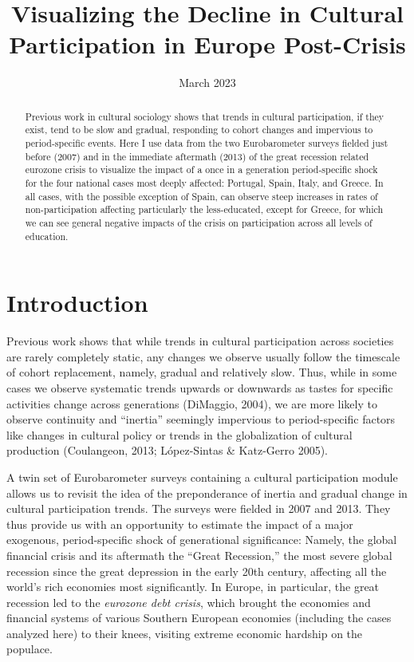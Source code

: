 \documentclass{article}
\title{Visualizing the Decline in Cultural Participation in Europe Post-Crisis}
\date{March 2023}
\begin{document}
\maketitle

\begin{abstract}
    Previous work in cultural sociology shows that trends in cultural participation, if they exist, tend to be slow and gradual, responding to cohort changes and impervious to period-specific events. Here I use data from the two Eurobarometer surveys fielded just before (2007) and in the immediate aftermath (2013) of the great recession related eurozone crisis to visualize the impact of a once in a generation period-specific shock for the four national cases most deeply affected: Portugal, Spain, Italy, and Greece. In all cases, with the possible exception of Spain, can observe steep increases in rates of non-participation affecting particularly the less-educated, except for Greece, for which we can see general negative impacts of the crisis on participation across all levels of education. \end{abstract}

\section{Introduction}
Previous work shows that while trends in cultural participation across societies are rarely completely static, any changes we observe usually follow the timescale of cohort replacement, namely, gradual and relatively slow. Thus, while in some cases we observe systematic trends upwards or downwards as tastes for specific activities change across generations (DiMaggio, 2004), we are more likely to observe continuity and ``inertia'' seemingly impervious to period-specific factors like changes in cultural policy or trends in the globalization of cultural production (Coulangeon, 2013; López-Sintas \& Katz-Gerro 2005).

A twin set of Eurobarometer surveys containing a cultural participation module allows us to revisit the idea of the preponderance of inertia and gradual change in cultural participation trends. The surveys were fielded in 2007 and 2013. They thus provide us with an opportunity to estimate the impact of a major exogenous, period-specific shock of generational significance: Namely, the global financial crisis and its aftermath the ``Great Recession,'' the most severe global recession since the great depression in the early 20th century,  affecting all the world's rich economies most significantly. In Europe, in particular, the great recession led to the {\em eurozone debt crisis}, which brought the economies and financial systems of various Southern European economies (including the cases analyzed here) to their knees, visiting extreme economic hardship on the populace.
\end{document}
